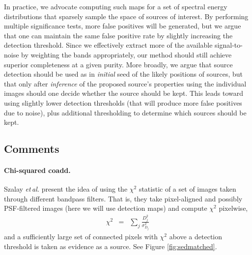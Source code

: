 \documentclass[letterpaper,preprint]{aastex62}
\newcommand{\latin}[1]{\emph{#1}}
\newcommand{\etal}{\latin{et\,al.}}
\begin{document}
In practice, we advocate computing such maps for a set of spectral
energy distributions that sparsely sample the space of sources of
interest.  By performing multiple significance tests, more false
positives will be generated, but we argue that one can maintain the
same false positive rate by slightly increasing the detection
threshold.  Since we effectively extract more of the available
signal-to-noise by weighting the bands appropriately, our method
should still achieve superior completeness at a given purity.
%
More broadly, we argue that source detection should be used as in
\emph{initial} seed of the likely positions of sources, but that only
after \emph{inference} of the proposed source's properties using the
individual images should one decide whether the source should be kept.
This leads toward using slightly lower detection thresholds (that will
produce more false positives due to noise), plus additional
thresholding to determine which sources should be kept.


\subsection{Comments}

\paragraph{Chi-squared coadd.}
Szalay \etal \citep{szalay1999} present the idea of using the $\chi^2$
statistic of a set of images taken through different bandpass filters.
That is, they take pixel-aligned and possibly PSF-filtered images
(here we will use detection maps) and compute $\chi^2$ pixelwise,
\begin{eqnarray}
  \chi^2 &=& \sum_j \frac{D_j^2}{\sigma_{D_j}^2}
\end{eqnarray}
and a sufficiently large set of connected pixels with $\chi^2$ above a
detection threshold is taken as evidence as a source.  See Figure
\ref{fig:sedmatched}.
\end{document}
